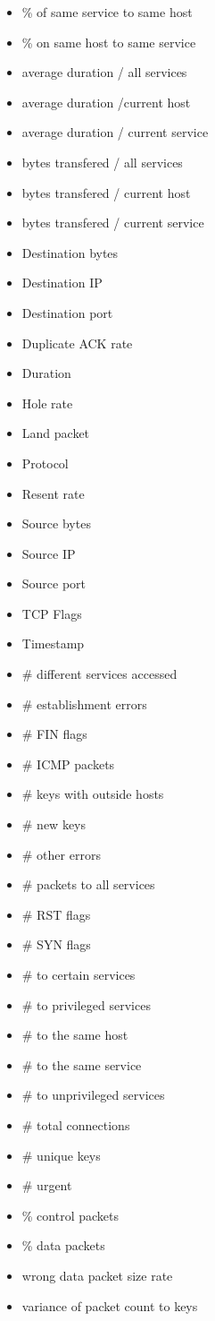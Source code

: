 \documentclass[12pt]{article}
\begin{document}
\begin{itemize}
\item \% of same service to same host
\item \% on same host to same service
\item average duration / all services
\item average duration /current host
\item average duration / current service
\item bytes transfered / all services
\item bytes transfered / current host
\item bytes transfered / current service
\item Destination bytes
\item Destination IP
\item Destination port
\item Duplicate ACK rate
\item Duration
\item Hole rate
\item Land packet
\item Protocol
\item Resent rate
\item Source bytes
\item Source IP
\item Source port
\item TCP Flags
\item Timestamp
\item \# different services accessed
\item \# establishment errors
\item \# FIN flags
\item \# ICMP packets
\item \# keys with outside hosts
\item \# new keys
\item \# other errors
\item \# packets to all services
\item \# RST flags
\item \# SYN flags
\item \# to certain services
\item \# to privileged services
\item \# to the same host
\item \# to the same service
\item \# to unprivileged services
\item \# total connections
\item \# unique keys
\item \# urgent
\item \% control packets
\item \% data packets
\item wrong data packet size rate
\item variance of packet count to keys
\end{itemize}
\end{document}

